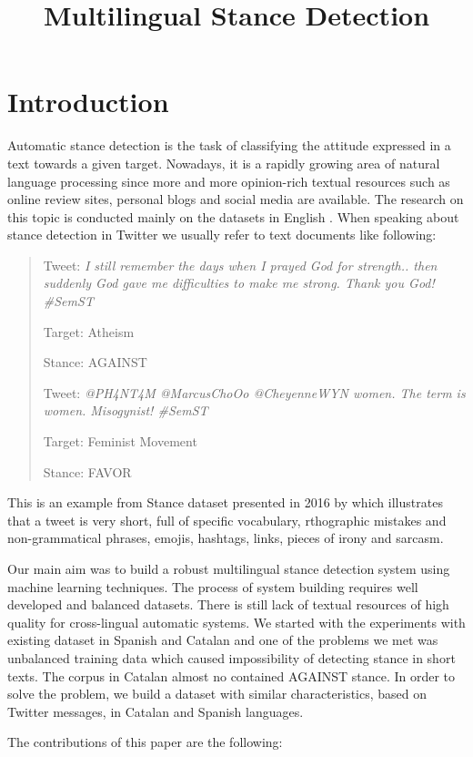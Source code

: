 \documentclass[10pt, a4paper]{article}
\title{Multilingual Stance Detection}
\begin{document}
\maketitleabstract

\section{Introduction}

Automatic stance detection is the task of classifying the attitude expressed in a text towards a given target. Nowadays, it is a rapidly growing area of natural language processing since more and more opinion-rich textual resources such as online review sites, personal blogs and social media are available. The research on this topic is conducted mainly on the datasets in English \cite{mohammad-etal-2016-semeval,augenstein-etal-2016-stance}.  When speaking about stance detection in Twitter we usually refer to text documents like following: 


\begin{quote}
Tweet: \textit{I still remember the days when I prayed God for strength.. then suddenly God gave me difficulties to make me strong. Thank you God! \#SemST}

Target: Atheism

Stance: AGAINST

Tweet: \textit{@PH4NT4M @MarcusChoOo @CheyenneWYN women. The term is women. Misogynist! \#SemST}

Target: Feminist Movement

Stance: FAVOR
\end{quote}

This is an example from Stance dataset presented in 2016 by \cite{Mohammad2016ADF} which illustrates that a tweet is very short, full of specific vocabulary, rthographic mistakes and non-grammatical phrases, emojis, hashtags, links, pieces of irony and sarcasm.

Our main aim was to build a robust multilingual stance detection system using machine learning techniques. The process of system building requires well developed and balanced datasets. There is still lack of textual resources of high quality for cross-lingual automatic systems. We started with the experiments with existing dataset in Spanish and Catalan \cite{taule18} and one of the problems we met was unbalanced training data which caused impossibility of detecting stance in short texts. The corpus in Catalan almost no contained AGAINST stance. In order to solve the problem, we build a dataset with similar characteristics, based on Twitter messages, in Catalan and Spanish languages.  

The contributions of this paper are the following: 
\end{document}
